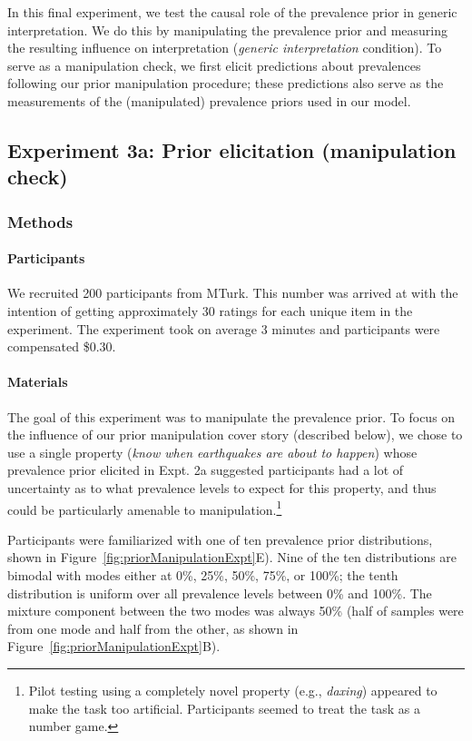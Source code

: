 \documentclass[floatsintext,man]{apa6}
\theoremstyle{definition}
\theoremstyle{definition}
\theoremstyle{definition}
\theoremstyle{remark}
\begin{document}
In this final experiment, we test the causal role of the prevalence
prior in generic interpretation. We do this by manipulating the
prevalence prior and measuring the resulting influence on interpretation
(\emph{generic interpretation} condition). To serve as a manipulation
check, we first elicit predictions about prevalences following our prior
manipulation procedure; these predictions also serve as the measurements
of the (manipulated) prevalence priors used in our model.

\subsection{Experiment 3a: Prior elicitation (manipulation
check)}\label{experiment-3a-prior-elicitation-manipulation-check}

\subsubsection{Methods}\label{methods-2}

\paragraph{Participants}\label{participants-4}

We recruited 200 participants from MTurk. This number was arrived at
with the intention of getting approximately 30 ratings for each unique
item in the experiment. The experiment took on average 3 minutes and
participants were compensated \$0.30.

\paragraph{Materials}\label{materials-1}

The goal of this experiment was to manipulate the prevalence prior. To
focus on the influence of our prior manipulation cover story (described
below), we chose to use a single property (\emph{know when earthquakes
are about to happen}) whose prevalence prior elicited in Expt. 2a
suggested participants had a lot of uncertainty as to what prevalence
levels to expect for this property, and thus could be particularly
amenable to manipulation.\footnote{Pilot testing using a completely
  novel property (e.g., \emph{daxing}) appeared to make the task too
  artificial. Participants seemed to treat the task as a number game.}

Participants were familiarized with one of ten prevalence prior
distributions, shown in Figure~\ref{fig:priorManipulationExpt}E). Nine
of the ten distributions are bimodal with modes either at 0\%, 25\%,
50\%, 75\%, or 100\%; the tenth distribution is uniform over all
prevalence levels between 0\% and 100\%. The mixture component between
the two modes was always 50\% (half of samples were from one mode and
half from the other, as shown in
Figure~\ref{fig:priorManipulationExpt}B).
\end{document}

